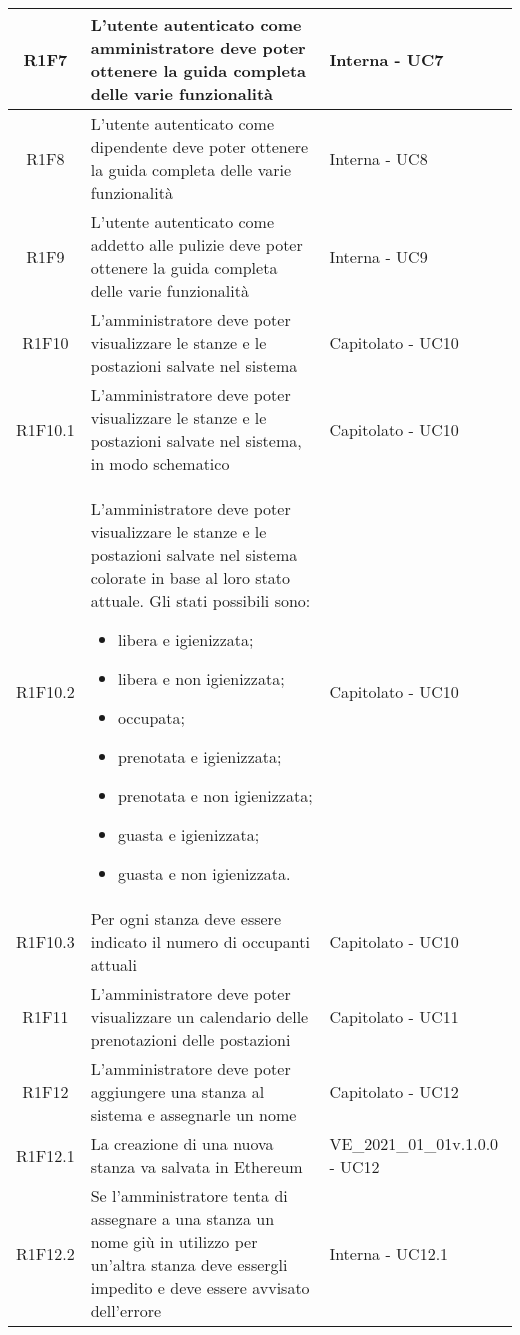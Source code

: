 \begin{center}
\begin{longtable}{|c|p{10cm}|p{4cm}|}
		\hline
		R1F7	&	L'utente autenticato come amministratore deve poter ottenere la guida completa delle varie funzionalità& Interna - UC7	\\
		\hline
		R1F8	&	L'utente autenticato come dipendente deve poter ottenere la guida completa delle varie funzionalità& Interna - UC8	\\
		\hline
		R1F9	&	L'utente autenticato come addetto alle pulizie deve poter ottenere la guida completa delle varie funzionalità& Interna - UC9	\\
		\hline
		R1F10&L'amministratore deve poter visualizzare le stanze e le postazioni salvate nel sistema& Capitolato - UC10	\\
		\hline
		R1F10.1&L'amministratore deve poter visualizzare le stanze e le postazioni salvate nel sistema, in modo schematico& Capitolato - UC10	\\
		\hline
		R1F10.2&L'amministratore deve poter visualizzare le stanze e le postazioni salvate nel sistema colorate in base al loro stato attuale. Gli stati possibili sono:
		\begin{itemize}
			\item libera e igienizzata;
			\item libera e non igienizzata;
			\item occupata;
			\item prenotata e igienizzata;
			\item prenotata e non igienizzata;
			\item guasta e igienizzata;
			\item guasta e non igienizzata.
		\end{itemize}& Capitolato - UC10	\\
		\hline
		R1F10.3&Per ogni stanza deve essere indicato il numero di occupanti attuali	& Capitolato - UC10	\\
		\hline
		R1F11&L'amministratore deve poter visualizzare un calendario delle prenotazioni delle postazioni	& Capitolato - UC11	\\
		\hline
		R1F12&L'amministratore deve poter aggiungere una stanza al sistema e assegnarle un nome	& Capitolato - UC12	\\
		\hline
		R1F12.1&	La creazione di una nuova stanza va salvata in Ethereum&VE\_2021\_01\_01v.1.0.0 - UC12 	\\
		\hline
		R1F12.2 & Se l'amministratore tenta di assegnare a una stanza un nome giù in utilizzo per un'altra stanza deve essergli impedito e deve essere avvisato dell'errore & Interna - UC12.1 \\

\end{longtable}
\end{center}
